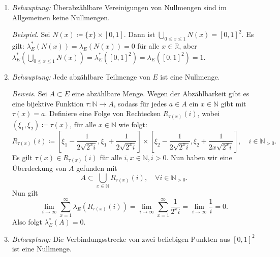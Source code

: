 \documentclass[a4paper,DIV=1]{article}
\theoremstyle{plain}
\begin{document}
\begin{enumerate}[label=(\roman*)]
	\item \textit{Behauptung:}  Überabzählbare Vereinigungen von Nullmengen sind im Allgemeinen keine Nullmengen.
	
	\textit{Beispiel.} Sei $N(x) \coloneqq \{ x \} \times [0,1]$. Dann ist $\bigcup\limits_{0 \leq x \leq 1} N(x) = [0,1]^2$. Es gilt: $\lambda_E^*(N(x)) = \lambda_E(N(x)) = 0$ für alle $x \in \mathbb R$, aber $\lambda_E^*(\bigcup\limits_{0 \leq x \leq 1} N(x)) = \lambda_E^*([0,1]^2) = \lambda_E([0,1]^2) = 1$.
	
	\item \textit{Behauptung:} Jede abzählbare Teilmenge von $E$ ist eine Nullmenge.
	
	\textit{Beweis.} Sei $A \subset E$ eine abzählbare Menge. Wegen der Abzählbarkeit gibt es eine bijektive Funktion $\tau: \mathbb N \to A$, sodass für jedes $a \in A$ ein $x \in \mathbb N$ gibt mit $\tau(x) = a$. Definiere eine Folge von Rechtecken $R_{\tau(x)}(i)$, wobei $(\xi_1,\xi_2) \coloneqq \tau(x)$, für alle $x \in \mathbb N$ wie folgt:
	 \[
	 	R_{\tau(x)}(i) \coloneqq [\xi_1-\frac{1}{2\sqrt{2^xi}},\xi_1+\frac{1}{2\sqrt{2^xi}}] \times [\xi_2-\frac{1}{2\sqrt{2^xi}},\xi_2+\frac{1}{2x\sqrt{2^xi}}], \quad i \in \mathbb N_{> 0}. 
	 \]
	Es gilt $\tau(x) \in R_{\tau(x)}(i)$ für alle $i,x \in \mathbb N, i >0$. Nun haben wir eine Überdeckung von $A$ gefunden mit
	\[
		A \subset \bigcup\limits_{x \in \mathbb N} R_{\tau(x)}(i), \quad \forall i \in \mathbb N_{>0}.
	\]
	Nun gilt
	\[
		\lim_{i \to \infty} \sum^{\infty}_{x=1} \lambda_E(R_{\tau(x)}(i)) = \lim_{i \to \infty} \sum_{x =1}^{\infty} \frac{1}{2^xi} =  \lim_{i \to \infty} \frac{1}{i} = 0.
	\]
	Also folgt $\lambda_E^*(A) = 0$.
	
	\item \textit{Behauptung:} Die Verbindungsstrecke von zwei beliebigen Punkten aus $[0,1]^2$ ist eine Nullmenge.
	

\end{enumerate}
\end{document}
